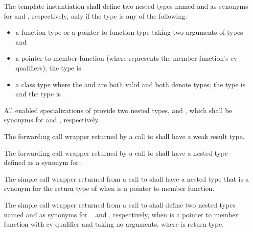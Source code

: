 %
%
\pnum
The template instantiation 
shall define two nested types
named  and 
as synonyms for  and , respectively,
only if the type  is any of the following:
\begin{itemize}
\item a function type or a pointer to function type taking two arguments of types  and 
\item a pointer to member function  \cv{} (where \cv{} represents the member function's cv-qualifiers); the type  is \cv{}~
\item a class type where the 
 and 
are both valid and both denote types;
the type  is  and
the type  is .
\end{itemize}

%
%
\pnum
All enabled specializations  of 
provide two nested types,  and ,
which shall be synonyms for  and , respectively.

%
\pnum
The forwarding call wrapper 
returned by a call to 
shall have a weak result type.

\pnum
The forwarding call wrapper 
returned by a call to 
shall have a nested type  defined as a synonym for .

%
\pnum
The simple call wrapper
returned from a call to 
shall have a nested type 
that is a synonym for
the return type of 
when  is a pointer to member function.

%
%
\pnum
The simple call wrapper
returned from a call to 
shall define two nested types
named  and 
as synonyms for \cv{}~ and , respectively,
when  is a pointer to member function
with cv-qualifier \cv{}
and taking no arguments,
where  is  return type.

